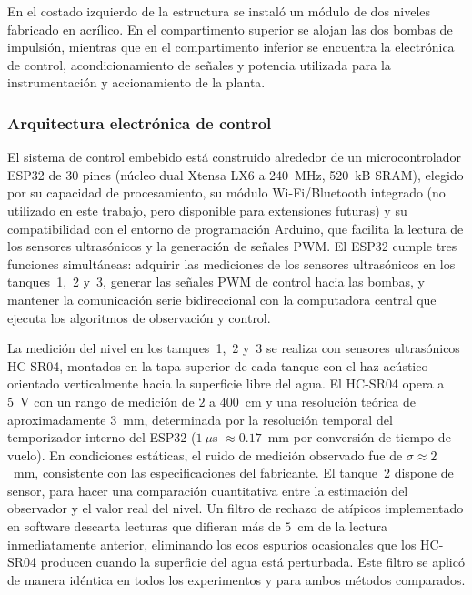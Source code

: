 \documentclass[12pt,letterpaper]{article}
\begin{document}
En el costado izquierdo de la estructura se instaló un módulo de dos
niveles fabricado en acrílico. En el compartimento superior se alojan
las dos bombas de impulsión, mientras que en el compartimento inferior
se encuentra la electrónica de control, acondicionamiento de señales y
potencia utilizada para la instrumentación y accionamiento de la planta.

\subsubsection{Arquitectura electrónica de control}

El sistema de control embebido está construido alrededor de un 
microcontrolador ESP32 de 30 pines (núcleo dual Xtensa LX6 a 240~MHz, 
520~kB SRAM), elegido por su capacidad de procesamiento, su módulo 
Wi-Fi/Bluetooth integrado (no utilizado en este trabajo, pero disponible 
para extensiones futuras) y su compatibilidad con el entorno de 
programación Arduino, que facilita la lectura de los sensores ultrasónicos 
y la generación de señales PWM. El ESP32 cumple tres funciones 
simultáneas: adquirir las mediciones de los sensores ultrasónicos en los 
tanques~1,~2 y~3, generar las señales PWM de control hacia las bombas, y 
mantener la comunicación serie bidireccional con la computadora central 
que ejecuta los algoritmos de observación y control.

La medición del nivel en los tanques~1,~2 y~3 se realiza con sensores 
ultrasónicos HC-SR04, montados en la tapa superior de cada tanque con el 
haz acústico orientado verticalmente hacia la superficie libre del agua. 
El HC-SR04 opera a 5~V con un rango de medición de $2$ a $400$~cm y una 
resolución teórica de aproximadamente $3$~mm, determinada por la 
resolución temporal del temporizador interno del ESP32 ($1~\mu$s $\approx 
0.17$~mm por conversión de tiempo de vuelo). En condiciones estáticas, el 
ruido de medición observado fue de $\sigma \approx 2$~mm, consistente con 
las especificaciones del fabricante. El tanque~2 dispone de sensor, para hacer una comparación cuantitativa entre la estimación del observador y el valor real del nivel. Un filtro de rechazo de atípicos implementado en software 
descarta lecturas que difieran más de $5$~cm de la lectura inmediatamente 
anterior, eliminando los ecos espurios ocasionales que los HC-SR04 
producen cuando la superficie del agua está perturbada. Este filtro se 
aplicó de manera idéntica en todos los experimentos y para ambos métodos 
comparados.
\end{document}
